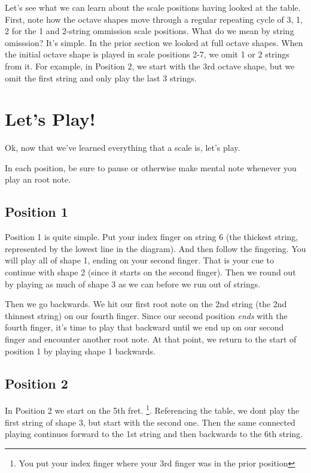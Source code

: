 \documentclass[12pt]{report}
\begin{document}
Let's see what we can learn about the scale positions having looked at
the table. First, note how the octave shapes move through a regular
repeating cycle of 3, 1, 2 for the 1 and 2-string ommission scale
positions. What do we mean by string omisssion? It's simple. In the
prior section we looked at full octave shapes. When the initial octave
shape is played in scale positions 2-7, we omit 1 or 2 strings from
it. For example, in Position 2, we start with the 3rd octave shape,
but we omit the first string and only play the last 3 strings. 

\section{Let's Play!}

Ok, now that we've learned everything that a scale is, let's play.

In each position, be sure to pause or otherwise make mental note
whenever you play an root note.

\subsection{Position 1}

Position 1 is quite simple. Put your index finger on string 6 (the
thickest string, represented by the lowest line in the diagram). And
then follow the fingering. You will play all of shape 1, ending on
your second finger. That is your cue to continue with shape 2 (since
it starts on the second finger). Then we round out by playing as much
of shape 3 as we can before we run out of strings.

Then we go backwards. We hit our first root note on the 2nd string
(the 2nd thinnest string) on our fourth finger. Since our second
position \emph{ends} with the fourth finger, it's time to play that
backward until we end up on our second finger and encounter another
root note. At that point, we return to the start of position 1 by
playing shape 1 backwards.

\subsection {Position 2}

In Position 2 we start on the 5th fret. \footnote{You put your index
  finger where your 3rd finger was in the prior position}. Referencing
the table, we dont play the first string of shape 3, but start with
the second one. Then the same connected playing continues forward to
the 1st string and then backwards to the 6th string.
\end{document}
